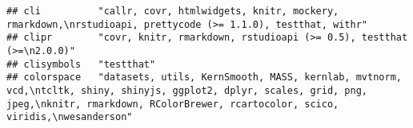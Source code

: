 \documentclass[]{book}
\begin{document}
\begin{verbatim}
## cli          "callr, covr, htmlwidgets, knitr, mockery, rmarkdown,\nrstudioapi, prettycode (>= 1.1.0), testthat, withr"                                                                                                                                                                                                                                                                                                                                                                                                                                                                                                                                                                                                
## clipr        "covr, knitr, rmarkdown, rstudioapi (>= 0.5), testthat (>=\n2.0.0)"                                                                                                                                                                                                                                                                                                                                                                                                                                                                                                                                                                                                                                       
## clisymbols   "testthat"                                                                                                                                                                                                                                                                                                                                                                                                                                                                                                                                                                                                                                                                                                
## colorspace   "datasets, utils, KernSmooth, MASS, kernlab, mvtnorm, vcd,\ntcltk, shiny, shinyjs, ggplot2, dplyr, scales, grid, png, jpeg,\nknitr, rmarkdown, RColorBrewer, rcartocolor, scico, viridis,\nwesanderson"                                                                                                                                                                                                                                                                                                                                                                                                                                                                                                   

\end{verbatim}
\end{document}
